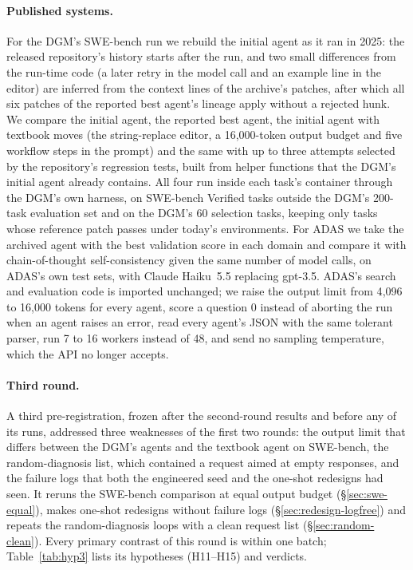 \paragraph{Published systems.} For the DGM's SWE-bench run we rebuild the initial agent as it ran in 2025: the released
repository's history starts after the run, and two small differences from the run-time code (a later retry in the
model call and an example line in the editor) are inferred from the context lines of the archive's patches, after
which all six patches of the reported best agent's lineage apply without a rejected hunk. We compare the initial
agent, the reported best agent, the initial agent with textbook moves (the string-replace editor, a 16{,}000-token
output budget and five workflow steps in the prompt) and the same with up to three attempts selected by the
repository's regression tests, built from helper functions that the DGM's initial agent already contains. All four run
inside each task's container through the DGM's own harness, on SWE-bench Verified tasks outside the DGM's 200-task
evaluation set and on the DGM's 60 selection tasks, keeping only tasks whose reference patch passes under today's
environments. For ADAS we take the archived agent with the best validation score in each domain and compare it with
chain-of-thought self-consistency \citep{wang2023selfconsistency} given the same number of model calls, on ADAS's own
test sets, with Claude Haiku~5.5 replacing gpt-3.5. ADAS's search and evaluation code is imported unchanged; we
raise the output limit from 4{,}096 to 16{,}000 tokens for every agent, score a question 0 instead of aborting the run
when an agent raises an error, read every agent's JSON with the same tolerant parser, run 7 to 16 workers instead of
48, and send no sampling temperature, which the API no longer accepts.

\paragraph{Third round.} A third pre-registration, frozen after the second-round results and before any of its runs,
addressed three weaknesses of the first two rounds: the output limit that differs between the DGM's agents and the
textbook agent on SWE-bench, the random-diagnosis list, which contained a request aimed at empty responses, and the
failure logs that both the engineered seed and the one-shot redesigns had seen. It reruns the SWE-bench comparison at
equal output budget (\S\ref{sec:swe-equal}), makes one-shot redesigns without failure logs
(\S\ref{sec:redesign-logfree}) and repeats the random-diagnosis loops with a clean request list
(\S\ref{sec:random-clean}). Every primary contrast of this round is within one batch; Table~\ref{tab:hyp3} lists its
hypotheses (H11--H15) and verdicts.
